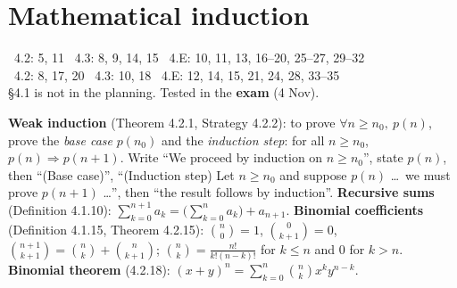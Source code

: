 \chapter{Mathematical induction}
%
{\fE\ 4.2: 5, 11 \textperiodcentered\ 4.3: 8, 9, 14, 15 \textperiodcentered\ 4.E: 10, 11, 13, 16--20, 25--27, 29--32\\ \fR\ 4.2: 8, 17, 20 \textperiodcentered\ 4.3: 10, 18 \textperiodcentered\ 4.E: 12, 14, 15, 21, 24, 28, 33--35\\ \S4.1 is not in the planning. Tested in the \textbf{exam} (4 Nov).}


\begin{key}
\textbf{Weak induction} (Theorem 4.2.1, Strategy 4.2.2): to prove $\forall n\ge n_0,\ p(n)$, prove the \emph{base case} $p(n_0)$ and the \emph{induction step}: for all $n\ge n_0$, $p(n)\Rightarrow p(n+1)$. Write ``We proceed by induction on $n\ge n_0$'', state $p(n)$, then ``(Base case)'', ``(Induction step) Let $n\ge n_0$ and suppose $p(n)$ \dots\ we must prove $p(n+1)$ \dots'', then ``the result follows by induction''. \textbf{Recursive sums} (Definition 4.1.10): $\sum_{k=0}^{n+1}a_k=\big(\sum_{k=0}^na_k\big)+a_{n+1}$. \textbf{Binomial coefficients} (Definition 4.1.15, Theorem 4.2.15): $\binom n0=1$, $\binom0{k+1}=0$, $\binom{n+1}{k+1}=\binom nk+\binom n{k+1}$; $\binom nk=\frac{n!}{k!(n-k)!}$ for $k\le n$ and $0$ for $k>n$. \textbf{Binomial theorem} (4.2.18): $(x+y)^n=\sum_{k=0}^n\binom nkx^ky^{n-k}$.
\end{key}

